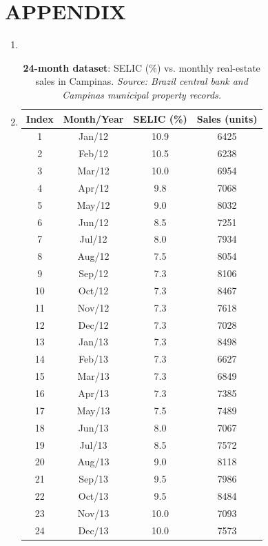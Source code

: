 \documentclass[10pt]{article}
\begin{document}
\clearpage
\section{APPENDIX}
\label{Appendix}

\begin{enumerate}\item 

\item 
\begin{table}[H]
\centering
\begin{tabular}{cccc}
\toprule
\textbf{Index} & \textbf{Month/Year} & \textbf{SELIC (\%)} & \textbf{Sales (units)} \\
\midrule
1  & Jan/12 & 10.9 & 6425\\
2  & Feb/12 & 10.5 & 6238\\
3  & Mar/12 & 10.0 & 6954\\
4  & Apr/12 & 9.8  & 7068\\
5  & May/12 & 9.0  & 8032\\
6  & Jun/12 & 8.5  & 7251\\
7  & Jul/12 & 8.0  & 7934\\
8  & Aug/12 & 7.5  & 8054\\
9  & Sep/12 & 7.3  & 8106\\
10 & Oct/12 & 7.3  & 8467\\
11 & Nov/12 & 7.3  & 7618\\
12 & Dec/12 & 7.3  & 7028\\
13 & Jan/13 & 7.3  & 8498\\
14 & Feb/13 & 7.3  & 6627\\
15 & Mar/13 & 7.3  & 6849\\
16 & Apr/13 & 7.3  & 7385\\
17 & May/13 & 7.5  & 7489\\
18 & Jun/13 & 8.0  & 7067\\
19 & Jul/13 & 8.5  & 7572\\
20 & Aug/13 & 9.0  & 8118\\
21 & Sep/13 & 9.5  & 7986\\
22 & Oct/13 & 9.5  & 8484\\
23 & Nov/13 & 10.0 & 7093\\
24 & Dec/13 & 10.0 & 7573\\
\bottomrule
\end{tabular}
\caption{\textbf{24-month dataset}: SELIC (\%) vs. monthly real-estate sales in Campinas. \emph{Source: Brazil central bank and Campinas municipal property records.}}
\label{tab:dataset24}
\end{table}


\end{enumerate}
\end{document}
